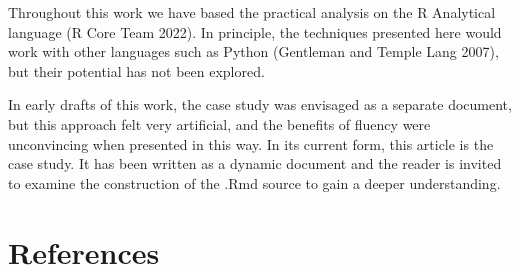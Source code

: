 \documentclass[smallextended]{svjour3}       %
\begin{document}
Throughout this work we have based the practical analysis on the R
Analytical language (R Core Team 2022). In principle, the techniques
presented here would work with other languages such as Python
(Gentleman and Temple Lang 2007), but their potential has not been explored.

In early drafts of this work, the case study was envisaged as a separate document, but this approach felt very artificial, and the benefits of fluency were unconvincing when presented in this way. In its current form, this article is the case study. It has been written as a dynamic document and the reader is invited to examine the construction of the .Rmd source to gain a deeper understanding.

\hypertarget{references}{%
\section*{References}\label{references}}
\end{document}
